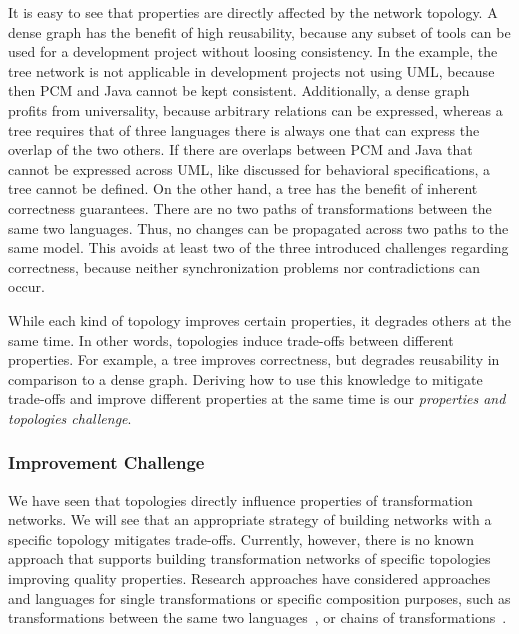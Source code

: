 It is easy to see that properties are directly affected by the network topology.
A dense graph has the benefit of high reusability, because any subset of tools can be used for a development project without loosing consistency.
In the example, the tree network is not applicable in development projects not using \gls{UML}, because then \gls{PCM} and Java cannot be kept consistent.
Additionally, a dense graph profits from universality, because arbitrary relations can be expressed, whereas a tree requires that of three languages there is always one that can express the overlap of the two others.
If there are overlaps between \gls{PCM} and Java that cannot be expressed across \gls{UML}, like discussed for behavioral specifications, a tree cannot be defined.
On the other hand, a tree has the benefit of inherent correctness guarantees.
There are no two paths of transformations between the same two languages.
Thus, no changes can be propagated across two paths to the same model.
This avoids at least two of the three introduced challenges regarding correctness, because neither synchronization problems nor contradictions can occur.

While each kind of topology improves certain properties, it degrades others at the same time.
In other words, topologies induce trade-offs between different properties.
For example, a tree improves correctness, but degrades reusability in comparison to a dense graph.
Deriving how to use this knowledge to mitigate trade-offs and improve different properties at the same time is our \emph{properties and topologies challenge}.

\subsubsection*{Improvement Challenge}

We have seen that topologies directly influence properties of transformation networks.
We will see that an appropriate strategy of building networks with a specific topology mitigates trade-offs.
Currently, however, there is no known approach that supports building transformation networks of specific topologies improving quality properties.
Research approaches have considered approaches and languages for single transformations or specific composition purposes, such as transformations between the same two languages~\cite{wagelaar2010a,wagelaar2011a}, or chains of transformations~\cite{pilgrim2008a, vanhooff2007UniTI-MODELS}.


